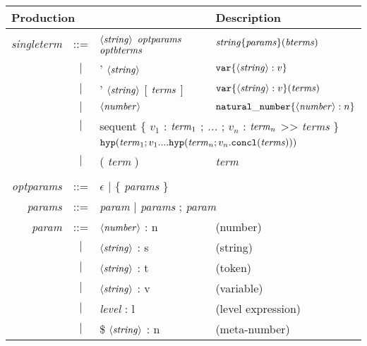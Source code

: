 \documentclass{article}
\begin{document}
\begin{table}[ht]
\begin{center}
  {\tt \begin{tabular}{|rcll|}
      \hline
      \multicolumn{3}{|l|}{Production} & Description\\
      \hline\hline
      {\it singleterm} & {\rm ::=} & $\left<{\it string} \right>$ ${\it optparams}$ ${\it optbterms}$ &
         ${\it string} \{ {\it params} \} ( {\it bterms} )$\\
                 & $|$ & ' $\left<{\it string}\right>$ &
                    ${\tt var}\{ \left< {\it string} \right> : v \}$\\
                 & $|$ & ' $\left<{\it string}\right>$ [ ${\it terms}$ ] &
                    ${\tt var} \{ \left<{\it string}\right> : v \}( {\it terms} )$\\
                 & $|$ & $\left<{\it number}\right>$ &
                    ${\tt natural\_number}\{ \left< {\it number} \right> : n \}$\\
                 & $|$ & \multicolumn{2}{l|}{%
                   sequent $\{$
                     $v_1$ \hbox{:} ${\it term}_1$ ; {\it ...} ; $v_n$ \hbox{:} ${\it term}_n$ >>
                     {\it terms} $\}$}\\
                 & & \multicolumn{2}{l|}{%
                        ${\tt hyp}({\it term}_1; v_1. ... {\tt hyp}({\it term}_n; v_n.
                        {\tt concl}({\it terms})))$}\\
                 & $|$ & ( {\it term} ) & {\it term}\\
      &&&\\
      {\it optparams} & {\rm ::=} & \multicolumn{2}{l|}{$\epsilon$ | $\{$ {\it params} $\}$}\\
      {\it params} & {\rm ::=} & \multicolumn{2}{l|}{{\it param} | {\it params} ; {\it param}}\\
      {\it param} & {\rm ::=} & $\left<{\it number}\right>$ \hbox{:} n & {\rm (number)}\\
            & $|$ & $\left<{\it string}\right>$ \hbox{:} s & {\rm (string)}\\
            & $|$ & $\left<{\it string}\right>$ \hbox{:} t & {\rm (token)}\\
            & $|$ & $\left<{\it string}\right>$ \hbox{:} v & {\rm (variable)}\\
            & $|$ & {\it level} \hbox{:} l & {\rm (level expression)}\\
            & $|$ & \$ $\left<{\it string}\right>$ \hbox{:} n & {\rm (meta-number)}\\

\end{tabular}}
\end{center}
\end{table}
\end{document}
